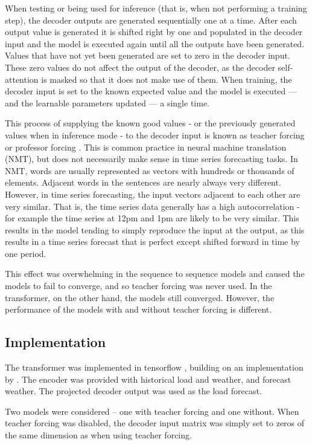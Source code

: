 When testing or being used for inference (that is, when not performing a training step), the decoder outputs are generated sequentially one at a time.
After each output value is generated it is shifted right by one and populated in the decoder input and the model is executed again until all the outputs have been generated.
Values that have not yet been generated are set to zero in the decoder input.
These zero values do not affect the output of the decoder, as the decoder self-attention is masked so that it does not make use of them.
When training, the decoder input is set to the known expected value and the model is executed --- and the learnable parameters updated --- a single time.

This process of supplying the known good values - or the previously generated values when in inference mode - to the decoder input is known as teacher forcing or professor forcing \cite{lamb2016professor}.
This is common practice in neural machine translation (NMT), but does not necessarily make sense in time series forecasting tasks.
In NMT, words are usually represented as vectors with hundreds or thousands of elements.
Adjacent words in the sentences are nearly always very different.
However, in time series forecasting, the input vectors adjacent to each other are very similar.
That is, the time series data generally has a high autocorrelation - for example the time series at 12pm and 1pm are likely to be very similar.
This results in the model tending to simply reproduce the input at the output, as this results in a time series forecast that is perfect except shifted forward in time by one period.

This effect was overwhelming in the sequence to sequence models and caused the models to fail to converge, and so teacher forcing was never used.
In the transformer, on the other hand, the models still converged.
However, the performance of the models with and without teacher forcing is different.

\subsection{Implementation}
The transformer was implemented in tensorflow \cite{tensorflow2015-whitepaper}, building on an implementation by \citet{Park2017}.
The encoder was provided with historical load and weather, and forecast weather.
The projected decoder output was used as the load forecast.

Two models were considered -- one with teacher forcing and one without.
When teacher forcing was disabled, the decoder input matrix was simply set to zeros of the same dimension as when using teacher forcing.

